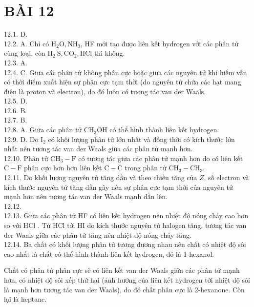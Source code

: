 \documentclass[10pt]{article}
\begin{document}
\section*{BÀI 12}
12.1. D.\\
12.2. A. Chỉ có $\mathrm{H}_{2} \mathrm{O}, \mathrm{NH}_{3}$, HF mới tạo được liên kết hydrogen với các phân tử cùng loại, còn $\mathrm{H}_{2} \mathrm{~S}, \mathrm{CO}_{2}, \mathrm{HCl}$ thì không.\\
12.3. A.\\
12.4. C. Giữa các phân tử không phân cực hoặc giữa các nguyên tử khí hiếm vẫn có thời điểm xuất hiện sự phân cực tạm thời (do nguyên tử chứa các hạt mang điện là proton và electron), do đó luôn có tương tác van der Waals.\\
12.5. D.\\
12.6. B.\\
12.7. B.\\
12.8. A. Giữa các phân tử $\mathrm{CH}_{3} \mathrm{OH}$ có thể hình thành liên kết hydrogen.\\
12.9. D. Do $\mathrm{I}_{2}$ có khối lượng phân tử lớn nhất và đồng thời có kích thưởc lớn nhất nên tương tác van der Waals giữa các phân tử mạnh hơn.\\
12.10. Phân tử $\mathrm{CH}_{3}-\mathrm{F}$ có tương tác giữa các phân tử mạnh hơn do có liên kết $\mathrm{C}-\mathrm{F}$ phân cực hơn hơn liên kết $\mathrm{C}-\mathrm{C}$ trong phân tử $\mathrm{CH}_{3}-\mathrm{CH}_{3}$.\\
12.11. Do khối lượng nguyên tử tăng dần và theo chiều tăng của $Z$, số electron và kích thước nguyên tử tăng dần gây nên sự phân cực tạm thời của nguyên tử mạnh hơn nên tương tác van der Waals mạnh dần lên.\\
12.12.\\
12.13. Giữa các phân tử HF có liên kết hydrogen nên nhiệt độ nóng chảy cao hơn so với HCl . Từ HCl tới HI do kích thước nguyên tử halogen tăng, tương tác van der Waals giữa các phân tử tăng nên nhiệt độ nóng chảy tăng.\\
12.14. Ba chất có khối lượng phân tử tương đương nhau nên chất có nhiệt độ sôi cao nhất là chất có thể hình thành liên kết hydrogen, đó là 1-hexanol.

Chất có phân tử phân cực sẽ có liên kết van der Waals giữa các phân tử mạnh hơn, có nhiệt độ sôi xếp thứ hai (ảnh hưởng của liên kết hydrogen tới nhiệt độ sôi là mạnh hơn tương tác van der Waals), do đó chất phân cực là 2-hexanone. Còn lại là heptane.
\end{document}
